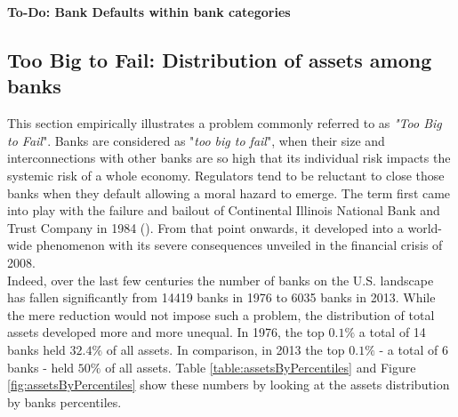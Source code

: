 \documentclass[12pt, a4paper]{article} %
\begin{document}
\textbf{To-Do: Bank Defaults within bank categories}

\fi

\newpage

\subsection{Too Big to Fail: Distribution of assets among banks}
\label{sec:ToBigToFail}

This section empirically illustrates a problem commonly referred to as \textit{"Too Big to Fail}". 
Banks are considered as "\textit{too big to fail}", when their size and interconnections with other banks are so high that its individual risk impacts the systemic risk of a whole economy. Regulators tend to be reluctant to close those banks when they default allowing a moral hazard to emerge. The term first came into play with the failure and bailout of Continental Illinois National Bank and Trust Company in 1984 (\citet{nurisso20171970s}). From that point onwards, it developed into a world-wide phenomenon with its severe consequences unveiled in the financial crisis of 2008.\\
Indeed, over the last few centuries the number of banks on the U.S. landscape has fallen significantly from 14419 banks in 1976 to 6035 banks in 2013. While the mere reduction would not impose such a problem, the distribution of total assets developed more and more unequal. In 1976, the top $0.1\%$ a total of 14 banks held $32.4\%$ of all assets. In comparison, in 2013 the top $0.1\%$ - a total of 6 banks - held $50\%$ of all assets. Table \ref{table:assetsByPercentiles} and Figure \ref{fig:assetsByPercentiles} show these numbers by looking at the assets distribution by banks percentiles.
\end{document}
